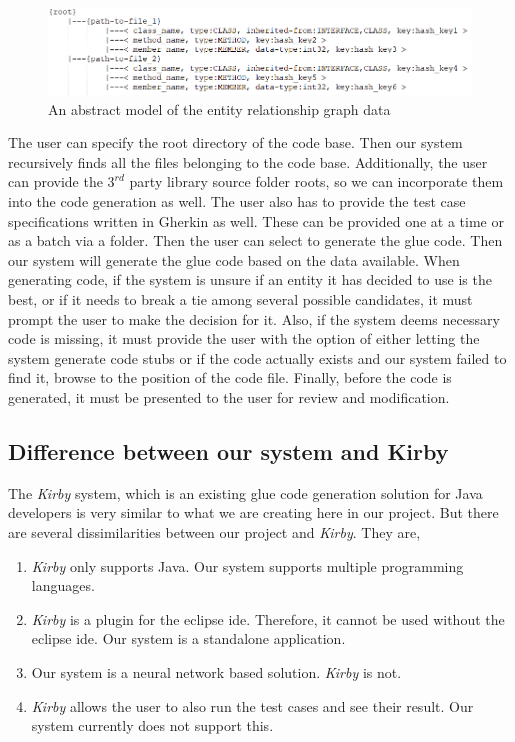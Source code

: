 \documentclass[conference, onecolumn, a4, 12pt]{IEEEtran}
\begin{document}
\begin{figure}
	\centering
	\includegraphics[width=0.7\linewidth]{graph_data_structure}
	\caption{An abstract model of the entity relationship graph data}
	\label{fig:graphdatastructure}
\end{figure}

The user can specify the root directory of the code base. Then our system recursively finds all the files belonging to the code base. Additionally, the user can provide the $3^{rd}$ party library source folder roots, so we can incorporate them into the code generation as well. The user also has to provide the test case specifications written in Gherkin as well. These can be provided one at a time or as a batch via a folder. Then the user can select to generate the glue code. Then our system will generate the glue code based on the data available. When generating code, if the system is unsure if an entity it has decided to use is the best, or if it needs to break a tie among several possible candidates, it must prompt the user to make the decision for it. Also, if the system deems necessary code is missing, it must provide the user with the option of either letting the system generate code stubs or if the code actually exists and our system failed to find it, browse to the position of the code file. Finally, before the code is generated, it must be presented to the user for review and modification.

\subsection{Difference between our system and Kirby}
The \textit{Kirby} system, which is an existing glue code generation solution for Java developers is very similar to what we are creating here in our project. But there are several dissimilarities between our project and \textit{Kirby}. They are,
\begin{enumerate}
	\item \textit{Kirby} only supports Java. Our system supports multiple programming languages.
	\item \textit{Kirby} is a plugin for the eclipse ide. Therefore, it cannot be used without the eclipse ide. Our system is a standalone application.
	\item Our system is a neural network based solution. \textit{Kirby} is not.
	\item \textit{Kirby} allows the user to also run the test cases and see their result. Our system currently does not support this.
\end{enumerate}
\end{document}
